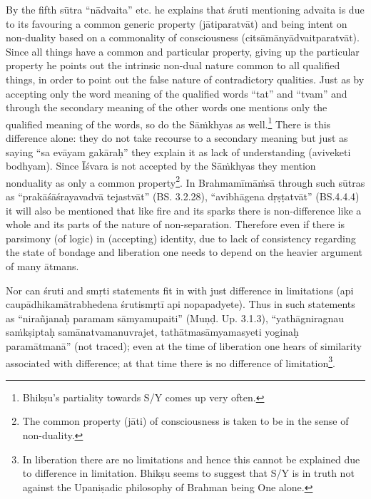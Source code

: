 By the fifth sūtra “nādvaita” etc. he explains that śruti mentioning advaita is due to its favouring a common generic property (jātiparatvāt) and being intent on non-duality based on a commonality of consciousness (citsāmānyādvaitparatvāt). Since all things have a common and particular property, giving up the particular property he points out the intrinsic non-dual nature common to all qualified things, in order to point out the false nature of contradictory qualities. Just as by accepting only the word meaning of the qualified words   “tat” and “tvam” and through the  secondary meaning of the other words one mentions only the qualified meaning of the words, so do the Sāṁkhyas as well.\footnote{Bhikṣu’s partiality towards S/Y comes up very often.} There is this difference alone: they do not take recourse to a secondary meaning but just as saying “sa evāyam gakāraḥ” they explain it as lack of understanding (aviveketi bodhyam). Since Īśvara is not accepted by the Sāṁkhyas they mention nonduality as only a common property\footnote{The common property (jāti) of consciousness is taken to be in the sense of non-duality.}. In Brahmamīmāṁsā through such sūtras as “prakāśāśrayavadvā tejastvāt” (BS. 3.2.28), “avibhāgena dṛṣṭatvāt” (BS.4.4.4) it will also be mentioned that like fire and its sparks there is non-difference like a whole and its parts of the nature of non-separation. Therefore even if there is parsimony (of logic) in  (accepting) identity, due to lack of consistency regarding the state of bondage and liberation one needs to depend on the heavier argument of many ātmans. 

Nor can śruti and smṛti statements fit in with just difference in limitations (api caupādhikamātrabhedena śrutismṛtī api nopapadyete). Thus in such statements as “nirañjanaḥ paramam sāmyamupaiti” (Muṇḍ. Up. 3.1.3), “yathāgniragnau saṁkṣiptaḥ samānatvamanuvrajet, tathātmasāmyamasyeti yoginaḥ paramātmanā” (not traced); even at the time of liberation one hears of similarity associated with difference; at that time there is no difference of limitation\footnote{In liberation there are no limitations and hence this cannot be explained due to difference in limitation. Bhikṣu seems to suggest that S/Y is in truth not against the Upaniṣadic philosophy of Brahman being One alone.}. 

